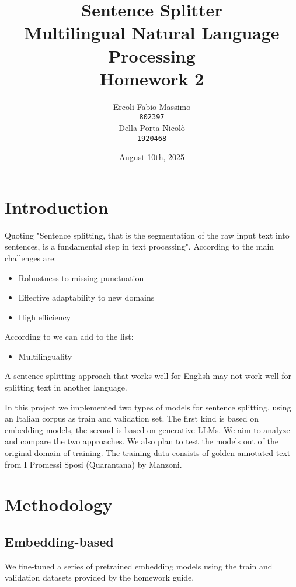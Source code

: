 \documentclass[11pt]{article}
\title{%
	Sentence Splitter\\
	\large Multilingual Natural Language Processing \\
	Homework 2}
\date{August 10th, 2025}
\author{Ercoli Fabio Massimo \\
\texttt{802397} \\\And
Della Porta Nicolò \\
\texttt{1920468} \\}
\begin{document}
\maketitle

\section{Introduction}

Quoting \cite{redaelli-sprugnoli-2024-sentence} "Sentence splitting, that is the segmentation of the raw input text into sentences, is a fundamental step in text processing".  According to \cite{frohmann2024segmenttextuniversalapproach} the main challenges are:

\begin{itemize}
	\item Robustness to missing punctuation
	\item Effective adaptability to new domains
	\item High efficiency
\end{itemize}

According to \cite{redaelli-sprugnoli-2024-sentence} we can add to the list:

\begin{itemize}
	\item Multilinguality
\end{itemize}
A sentence splitting approach that works well for English may not work well for splitting text in another language.

In this project we implemented two types of models for sentence splitting, using an Italian corpus as train and validation set.
The first kind is based on embedding models, the second is based on generative LLMs.
We aim to analyze and compare the two approaches. 
We also plan to test the models out of the original domain of training. 
The training data consists of golden-annotated text from I Promessi Sposi (Quarantana) by Manzoni.

\section{Methodology}

\subsection{Embedding-based}

We fine-tuned a series of pretrained embedding models using the train and validation datasets provided by the homework guide.
\end{document}

